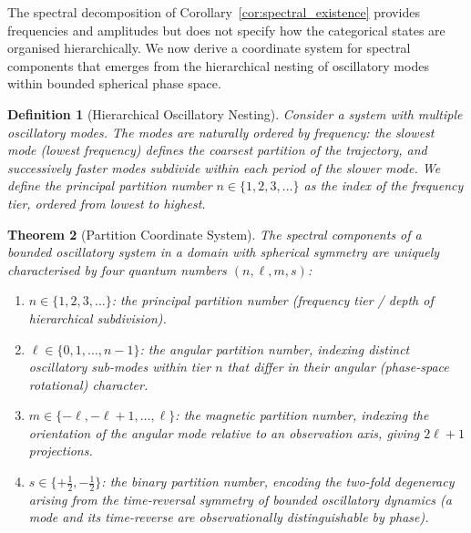 \documentclass[11pt,twocolumn,a4paper]{article}
\newtheorem{theorem}{Theorem}[section]
\newtheorem{definition}[theorem]{Definition}
\begin{document}
The spectral decomposition of Corollary~\ref{cor:spectral_existence}
provides frequencies and amplitudes but does not specify how the
categorical states are organised hierarchically. We now derive a
coordinate system for spectral components that emerges from the
hierarchical nesting of oscillatory modes within bounded spherical
phase space.

\begin{definition}[Hierarchical Oscillatory Nesting]
\label{def:nesting}
Consider a system with multiple oscillatory modes. The modes are
naturally ordered by frequency: the slowest mode (lowest frequency)
defines the coarsest partition of the trajectory, and successively
faster modes subdivide within each period of the slower mode. We define
the \emph{principal partition number} $n \in \{1, 2, 3, \ldots\}$ as
the index of the frequency tier, ordered from lowest to highest.
\end{definition}

\begin{theorem}[Partition Coordinate System]
\label{thm:partition_coords}
The spectral components of a bounded oscillatory system in a domain with
spherical symmetry are uniquely characterised by four quantum numbers
$(n, \ell, m, s)$:
\begin{enumerate}[label=(\roman*),nosep]
  \item $n \in \{1, 2, 3, \ldots\}$: the principal partition number
    (frequency tier / depth of hierarchical subdivision).
  \item $\ell \in \{0, 1, \ldots, n-1\}$: the angular partition number,
    indexing distinct oscillatory sub-modes within tier $n$ that differ
    in their angular (phase-space rotational) character.
  \item $m \in \{-\ell, -\ell+1, \ldots, \ell\}$: the magnetic
    partition number, indexing the orientation of the angular mode
    relative to an observation axis, giving $2\ell + 1$ projections.
  \item $s \in \{+\tfrac{1}{2}, -\tfrac{1}{2}\}$: the binary partition
    number, encoding the two-fold degeneracy arising from the
    time-reversal symmetry of bounded oscillatory dynamics (a mode and
    its time-reverse are observationally distinguishable by phase).
\end{enumerate}
\end{theorem}
\end{document}
